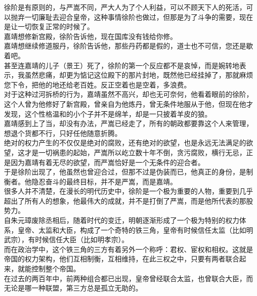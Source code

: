 \begin{multicols}{\theparacolNo}
徐阶是有原则的，与严嵩不同，严大人为了个人利益，可以不顾天下人的死活，可以抛弃一切廉耻去迎合皇帝，这种事情徐阶也做过，但那是为了斗争的需要，现在是让一切恢复正常的时候了。\\

嘉靖想修新宫殿，徐阶告诉他，现在国库没有钱给你修。\\

嘉靖想继续修道服丹，徐阶告诉他，那些丹药都是假的，道士也不可信，您还是歇着吧。\\

甚至连嘉靖的儿子（景王）死了，徐阶的第一个反应都不是哀悼，而是婉转地表示，我虽然悲痛，却更为惦记这位殿下的那片封地，既然他已经挂掉了，那就麻烦您下令，把他的地还给老百姓。反正空着也是空着，多浪费。\\

对于这种过河拆桥的行为，嘉靖虽然不高兴，却也无可奈何，他看着眼前的徐阶，这个人曾为他修好了新宫殿，曾亲自为他炼丹，曾无条件地服从于他，但现在他才发现，这个性格温和的小个子并不是绵羊，却是一只披着羊皮的狼。\\

嘉靖感到上了当，却没有办法，严嵩已经走了，所有的朝政都要靠这个人来管理，想退个货都不行，只好任他随意折腾。\\

绝对的权力产生的不仅仅是绝对的腐败，还有绝对的欲望，也是永远无法满足的欲望，这才是一切祸患的起始，严嵩所以屹立数十年不倒，贪污腐败，横行无忌，正是因为嘉靖有着无尽的欲望，而严嵩恰好是一个无条件的迎合者。\\

于是徐阶出现了，他虽然也曾迎合过，但那不过是伪装而已，他真正的身份，是制衡者。他隐忍奋斗的最终目标，并不是严嵩，而是嘉靖。\\

很多人并不清楚，在漫长的明代历史中，徐阶是一个极为重要的人物，重要到几乎超出了所有人的想象，他最伟大的成就，并不是打倒了严嵩，而是他所代表的那股势力。\\

自朱元璋废除丞相后，随着时代的变迁，明朝逐渐形成了一个极为特别的权力体系，皇帝、太监和大臣，构成了一个奇特的铁三角，皇帝有时候信任太监（比如明武宗），有时候信任大臣（比如明孝宗）。\\

而在政治学中，这个铁三角的三方有着另外一个称呼：君权、宦权和相权。这就是帝国的权力架构，他们互相制衡，互相维持，在此三权之中，只要有两者联合起来，就能控制整个帝国。\\

在过去的两百年中，前两种组合都已出现，皇帝曾经联合太监，也曾联合大臣，而无论是哪一种联盟，第三方总是孤立无助的。\\


\end{multicols}
